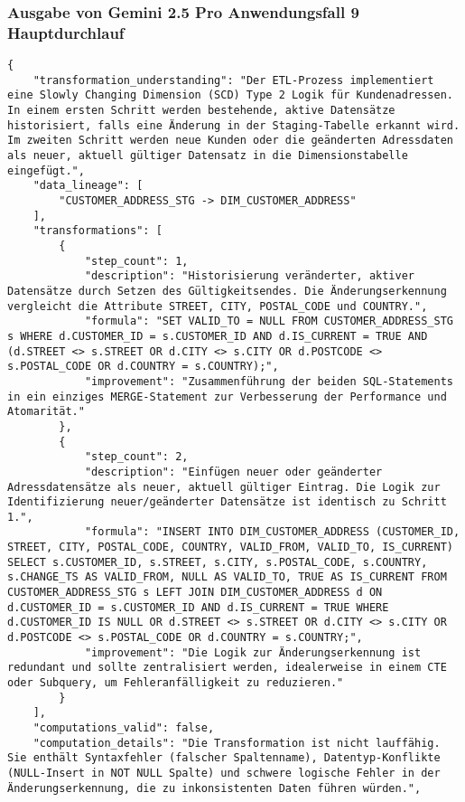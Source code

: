 \subsubsection{Ausgabe von Gemini 2.5 Pro Anwendungsfall 9 Hauptdurchlauf}\label{anhang:subsubsec:gemini_case9_prompt1}
\begin{lstlisting}[caption={Ausgabe: Gemini 2.5 Pro Anwendungsfall 9 Hauptdurchlauf},label={gemini_case9_prompt1}]
{
    "transformation_understanding": "Der ETL-Prozess implementiert eine Slowly Changing Dimension (SCD) Type 2 Logik für Kundenadressen. In einem ersten Schritt werden bestehende, aktive Datensätze historisiert, falls eine Änderung in der Staging-Tabelle erkannt wird. Im zweiten Schritt werden neue Kunden oder die geänderten Adressdaten als neuer, aktuell gültiger Datensatz in die Dimensionstabelle eingefügt.",
    "data_lineage": [
        "CUSTOMER_ADDRESS_STG -> DIM_CUSTOMER_ADDRESS"
    ],
    "transformations": [
        {
            "step_count": 1,
            "description": "Historisierung veränderter, aktiver Datensätze durch Setzen des Gültigkeitsendes. Die Änderungserkennung vergleicht die Attribute STREET, CITY, POSTAL_CODE und COUNTRY.",
            "formula": "SET VALID_TO = NULL FROM CUSTOMER_ADDRESS_STG s WHERE d.CUSTOMER_ID = s.CUSTOMER_ID AND d.IS_CURRENT = TRUE AND (d.STREET <> s.STREET OR d.CITY <> s.CITY OR d.POSTCODE <> s.POSTAL_CODE OR d.COUNTRY = s.COUNTRY);",
            "improvement": "Zusammenführung der beiden SQL-Statements in ein einziges MERGE-Statement zur Verbesserung der Performance und Atomarität."
        },
        {
            "step_count": 2,
            "description": "Einfügen neuer oder geänderter Adressdatensätze als neuer, aktuell gültiger Eintrag. Die Logik zur Identifizierung neuer/geänderter Datensätze ist identisch zu Schritt 1.",
            "formula": "INSERT INTO DIM_CUSTOMER_ADDRESS (CUSTOMER_ID, STREET, CITY, POSTAL_CODE, COUNTRY, VALID_FROM, VALID_TO, IS_CURRENT) SELECT s.CUSTOMER_ID, s.STREET, s.CITY, s.POSTAL_CODE, s.COUNTRY, s.CHANGE_TS AS VALID_FROM, NULL AS VALID_TO, TRUE AS IS_CURRENT FROM CUSTOMER_ADDRESS_STG s LEFT JOIN DIM_CUSTOMER_ADDRESS d ON d.CUSTOMER_ID = s.CUSTOMER_ID AND d.IS_CURRENT = TRUE WHERE d.CUSTOMER_ID IS NULL OR d.STREET <> s.STREET OR d.CITY <> s.CITY OR d.POSTCODE <> s.POSTAL_CODE OR d.COUNTRY = s.COUNTRY;",
            "improvement": "Die Logik zur Änderungserkennung ist redundant und sollte zentralisiert werden, idealerweise in einem CTE oder Subquery, um Fehleranfälligkeit zu reduzieren."
        }
    ],
    "computations_valid": false,
    "computation_details": "Die Transformation ist nicht lauffähig. Sie enthält Syntaxfehler (falscher Spaltenname), Datentyp-Konflikte (NULL-Insert in NOT NULL Spalte) und schwere logische Fehler in der Änderungserkennung, die zu inkonsistenten Daten führen würden.",

\end{lstlisting}
